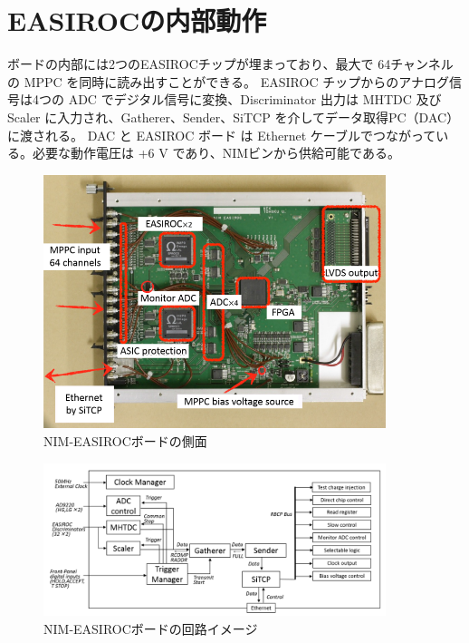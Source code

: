 
\section{EASIROCの内部動作}
ボードの内部には2つのEASIROCチップが埋まっており、最大で 64チャンネルの MPPC を同時に読み出すことができる。
EASIROC チップからのアナログ信号は4つの ADC でデジタル信号に変換、Discriminator 出力は MHTDC 及び Scaler に入力され、Gatherer、Sender、SiTCP を介してデータ取得PC（DAC）に渡される。
DAC と EASIROC ボード は Ethernet ケーブルでつながっている。必要な動作電圧は +6 V であり、NIMビンから供給可能である。
\begin{figure}[H]
\begin{center}
\includegraphics[width = 10.0cm, bb= 0 0 735 544]{2.png}
\end{center}
\caption{NIM-EASIROCボードの側面}
\label{fig:}
\end{figure}

\begin{figure}[H]
\begin{center}
\includegraphics[width = 10.0cm, bb= 0 0 952 424]{3.png}
\end{center}
\caption{NIM-EASIROCボードの回路イメージ}
\label{fig:}
\end{figure}

